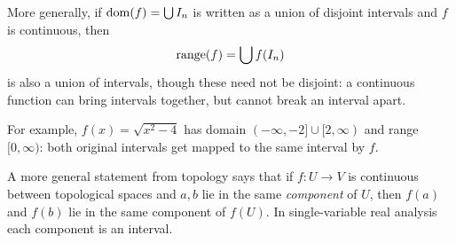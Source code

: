 More generally, if $\operatorname{dom}(f)=\bigcup I_n$ is written as a union of disjoint intervals and $f$ is continuous, then
\[\operatorname{range}(f)=\bigcup f(I_n)\]
is also a union of intervals, though these need not be disjoint: a continuous function can bring intervals together, but cannot break an interval apart.\medbreak

For example, $f(x)=\sqrt{x^2-4}$ has domain $(-\infty,-2]\cup[2,\infty)$ and range $[0,\infty)$: both original intervals get mapped to the same interval by $f$.\medbreak

A more general statement from topology says that if $f:U\to V$ is continuous between topological spaces and $a,b$ lie in the same \emph{component} of $U$, then $f(a)$ and $f(b)$ lie in the same component of $f(U)$. In single-variable real analysis each component is an interval.

